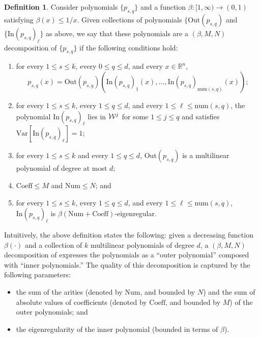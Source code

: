 \documentclass[11pt]{article}
\numberwithin{equation}{section}
\theoremstyle{definition}
\newtheorem{definition}[theorem]{Definition}
\theoremstyle{plain}
\newcommand{\R}{\mathbb R}
\newcommand{\Inner}{\mathrm{In}}
\newcommand{\Outer}{\mathrm{Out}}
\newcommand{\num}{\mathrm{num}}
\newcommand{\Var}{\mathrm{Var}}
\begin{document}
\begin{definition}
    Consider polynomials $\{p_{s,q}\}$ and a function $\beta: [1, \infty) \to (0, 1)$ satisfying $\beta(x) \le 1/x$.
    Given collections of polynomials $\{\Outer(p_{s,q})$ and $\{\Inner(p_{s,q})_\ell\}$ as above, we say that
        these polynomials are a $(\beta, M, N)$ decomposition of $\{p_{s,q}\}$ if the following conditions hold:

\begin{enumerate}
    \item for every $1 \le s \le k$, every $0 \le q \le d$, and every $x \in \R^n$,
    \begin{equation} \label{eq:tildep}
        p_{s,q}(x)=
        \Outer(p_{s,q})\left(
        \Inner(p_{s,q})_1(x),\dots, \Inner(p_{s,q})_{\num({s,q})}(x)\right);
    \end{equation}
    \item for every $1 \le s \le k$, every $1 \leq q \leq d$, and every $1 \le \ell \le \num(s,q)$,
        the polynomial $\Inner(p_{s,q})_\ell$ lies in ${\cal W}^j$ for some $1 \leq j \leq q$ and
        satisfies $\Var[\Inner(p_{s,q})_\ell] = 1$;

    \item for every $1 \le s \le k$ and every $1 \leq q \leq d$,
    $\Outer(p_{s,q})$ is a multilinear polynomial of degree at most $d$;

    \item $\mathrm{Coeff} \le M$ and $\mathrm{Num} \le N$; and

    \item for every $1 \le s \le k$, every $1 \leq q \leq d$, and every $1 \le \ell \le \num(s,q)$,
        $\Inner(p_{s,q})_\ell$ is $\beta(\mathrm{Num} + \mathrm{Coeff})$-eigenregular.
\end{enumerate}
\end{definition}

Intuitively, the above definition states the following: given a decreasing
function $\beta(\cdot)$ and a collection of $k$ multilinear polynomials of degree
$d$, a $(\beta, M,N)$ decomposition of expresses the polynomials as a ``outer
polynomial'' composed with ``inner polynomials.'' The quality of this
decomposition is captured by the following parameters: 
\begin{itemize}
\item the sum of the arities (denoted by $\mathrm{Num}$, and bounded by $N$) and the sum of
    absolute values of coefficients (denoted by $\mathrm{Coeff}$, and bounded by $M$) of the outer
    polynomials; and
\item the eigenregularity of the inner polynomial (bounded in terms of $\beta$).
\end{itemize}
\end{document}
